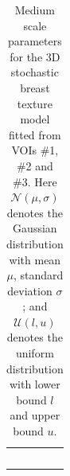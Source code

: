 \documentclass[journal]{IEEEtran}
\begin{document}
\begin{table}[!htb]
  {\fontsize{9}{8}\selectfont
    \begin{center}

      \caption{Medium scale parameters for the 3D stochastic breast
        texture model fitted from VOIs \#1, \#2 and \#3. Here
        $\mathcal{N}(\mu, \sigma)$ denotes the Gaussian distribution
        with mean $\mu$, standard deviation $\sigma$; and
        $\mathcal{U}(l,u)$ denotes the uniform distribution with lower
        bound $l$ and upper bound $u$.}

      \begin{tabular}{ m{1.6cm} m{1.8cm} m{1.8cm} m{1.8cm} }

        \toprule

        \centering{\textbf{Parameters}}
        & \centering{VOI \#1}
        & \centering{VOI \#2}
        & \centering{VOI \#3}
          \tabularnewline%

        \cmidrule(lr){1-1} \cmidrule(lr){2-2}
        \cmidrule(lr){3-3} \cmidrule(lr){4-4}

        \centering{$\kappa$ (\si{\per\mm\cubed})}
        & \centering{$3.24e-03$}
        & \centering{$3.41e-03$}
        & \centering{$2.87e-04$}
          \tabularnewline%

        \cmidrule(lr){1-1} \cmidrule(lr){2-2}
        \cmidrule(lr){3-3} \cmidrule(lr){4-4}

        \centering{$\lambda_0$ (\si{\per\mm\cubed})}
        & \centering{$5.98e-03$}
        & \centering{$1.92e-02$}
        & \centering{$3.09e-02$}
          \tabularnewline%

        \cmidrule(lr){1-1} \cmidrule(lr){2-2}
        \cmidrule(lr){3-3} \cmidrule(lr){4-4}

        \centering{$R$ (\si{\mm})}
        & \centering{$5.98$}
        & \centering{$3.85$}
        & \centering{$5.82$}
          \tabularnewline%

        \cmidrule(lr){1-1} \cmidrule(lr){2-2}
        \cmidrule(lr){3-3} \cmidrule(lr){4-4}

        \centering{$p_{L_a}$ (\si{\mm})}
        & \centering{$\mathcal{N}(6.21, 1.41)$}
        & \centering{$\mathcal{N}(5.88, 1.44)$}
        & \centering{$\mathcal{N}(6.06, 1.39)$}
          \tabularnewline%


\end{tabular}
\end{center}}
\end{table}
\end{document}
